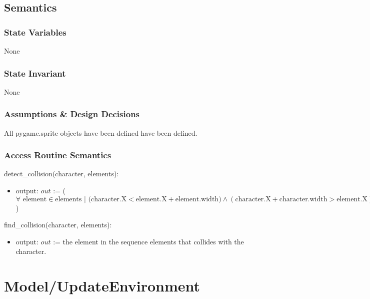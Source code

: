 \documentclass[12pt]{article}
\begin{document}
\subsection* {Semantics}

\subsubsection* {State Variables}

None

\subsubsection* {State Invariant}

None

\subsubsection* {Assumptions \& Design Decisions}

All pygame.sprite objects have been defined have been defined.

\subsubsection* {Access Routine Semantics}

detect\_collision(character, elements):
\begin{itemize}
    \item output: $out$ := ($\forall \text{ element} \in \text{elements } | \text{ (character.X}< \text{element.X} + \text{element.width}) \land (\text{character.X} + \text{character.width} > \text{element.X}) \land (\text{character.Y} < \text{element.Y} + \text{element.height}) \land (\text{character.Y} + \text{Character.height} > \text{element.Y})$)
\end{itemize}

\noindent find\_collision(character, elements):
\begin{itemize}
    \item output: $out$ := the element in the sequence elements that collides with the character.
\end{itemize}


\newpage
\section*{Model/UpdateEnvironment}
\end{document}
